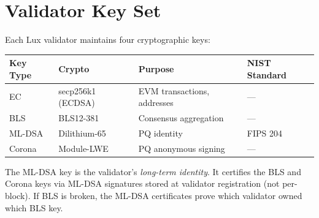 \section{Validator Key Set}


Each Lux validator maintains four cryptographic keys:

\begin{center}
\begin{tabular}{llll}
\toprule
\textbf{Key Type} & \textbf{Crypto} & \textbf{Purpose} & \textbf{NIST Standard} \\
\midrule
EC & secp256k1 (ECDSA) & EVM transactions, addresses & --- \\
BLS & BLS12-381 & Consensus aggregation & --- \\
ML-DSA & Dilithium-65 & PQ identity & FIPS 204 \\
Corona & Module-LWE & PQ anonymous signing & --- \\
\bottomrule
\end{tabular}
\end{center}

The ML-DSA key is the validator's \textit{long-term identity}. It certifies the BLS and Corona keys via ML-DSA signatures stored at validator registration (not per-block). If BLS is broken, the ML-DSA certificates prove which validator owned which BLS key.


